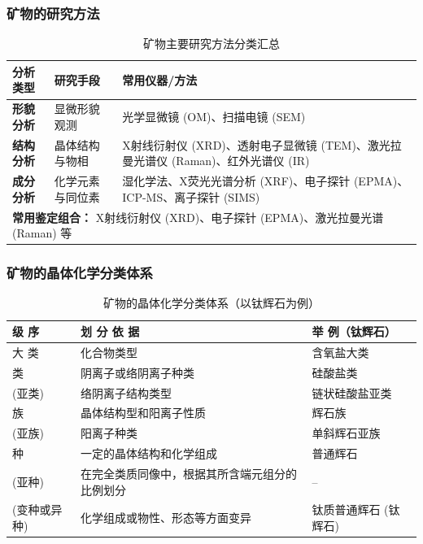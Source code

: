 \documentclass[12pt,a4paper]{article}
\begin{document}
	\subsubsection{矿物的研究方法}
	\begin{table}[htbp]
		\centering
		\caption{矿物主要研究方法分类汇总}
		\label{tab:mineral_methods}
		\small
		\begin{tabularx}{\textwidth}{llX}
			\toprule
			分析类型 & 研究手段 & 常用仪器/方法 \\
			\midrule
			\textbf{形貌分析} & 显微形貌观测 & 光学显微镜 (OM)、扫描电镜 (SEM) \\
			\addlinespace
			\textbf{结构分析} & 晶体结构与物相 & X射线衍射仪 (XRD)、透射电子显微镜 (TEM)、激光拉曼光谱仪 (Raman)、红外光谱仪 (IR) \\
			\addlinespace
			\textbf{成分分析} & 化学元素与同位素 & 湿化学法、X荧光光谱分析 (XRF)、电子探针 (EPMA)、ICP-MS、离子探针 (SIMS) \\
			\midrule
			\multicolumn{3}{l}{\textbf{常用鉴定组合：} X射线衍射仪 (XRD)、电子探针 (EPMA)、激光拉曼光谱 (Raman) 等} \\
			\bottomrule
		\end{tabularx}
	\end{table}
	\subsubsection{矿物的晶体化学分类体系}
	\begin{table}[htbp]
		\centering
		\caption{矿物的晶体化学分类体系（以钛辉石为例）}
		\label{tab:mineral_classification}
		\small
		\begin{tabularx}{\textwidth}{l p{7cm} l}
			\toprule
			\textbf{级 序} & \textbf{划 分 依 据} & \textbf{举 例（钛辉石）} \\
			\midrule
			大 类 & 化合物类型 & 含氧盐大类 \\
			类 & 阴离子或络阴离子种类 & 硅酸盐类 \\
			(亚类) & 络阴离子结构类型 & 链状硅酸盐亚类 \\
			族 & 晶体结构型和阳离子性质 & 辉石族 \\
			(亚族) & 阳离子种类 & 单斜辉石亚族 \\
			种 & 一定的晶体结构和化学组成 & 普通辉石 \\
			(亚种) & 在完全类质同像中，根据其所含端元组分的比例划分 & -- \\
			(变种或异种) & 化学组成或物性、形态等方面变异 & 钛质普通辉石 (钛辉石) \\
			\bottomrule
		\end{tabularx}
	\end{table}
	
\end{document}
